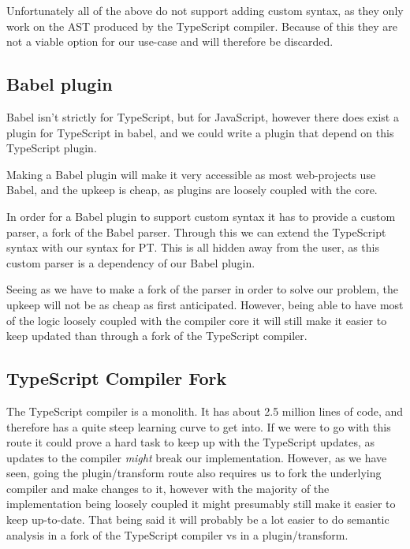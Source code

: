 Unfortunately all of the above do not support adding custom syntax, as they only work on the AST produced by the TypeScript compiler.
Because of this they are not a viable option for our use-case and will therefore be discarded.

\subsection{Babel plugin}\label{subsec:babel-plugin}

Babel isn't strictly for TypeScript, but for JavaScript, however there does exist a plugin for TypeScript in babel, and we could write a plugin that depend on this TypeScript plugin.

Making a Babel plugin will make it very accessible as most web-projects use Babel, and the upkeep is cheap, as plugins are loosely coupled with the core.

In order for a Babel plugin to support custom syntax it has to provide a custom parser, a fork of the Babel parser.
Through this we can extend the TypeScript syntax with our syntax for PT\@.
This is all hidden away from the user, as this custom parser is a dependency of our Babel plugin.

Seeing as we have to make a fork of the parser in order to solve our problem, the upkeep will not be as cheap as first anticipated.
However, being able to have most of the logic loosely coupled with the compiler core it will still make it easier to keep updated than through a fork of the TypeScript compiler.


\subsection{TypeScript Compiler Fork}\label{subsec:typescript-compiler-fork}

The TypeScript compiler is a monolith.
It has about 2.5 million lines of code, and therefore has a quite steep learning curve to get into.
If we were to go with this route it could prove a hard task to keep up with the TypeScript updates, as updates to the compiler \textit{might} break our implementation.
However, as we have seen, going the plugin/transform route also requires us to fork the underlying compiler and make changes to it, however with the majority of the implementation being loosely coupled it might presumably still make it easier to keep up-to-date.
That being said it will probably be a lot easier to do semantic analysis in a fork of the TypeScript compiler vs in a plugin/transform.

